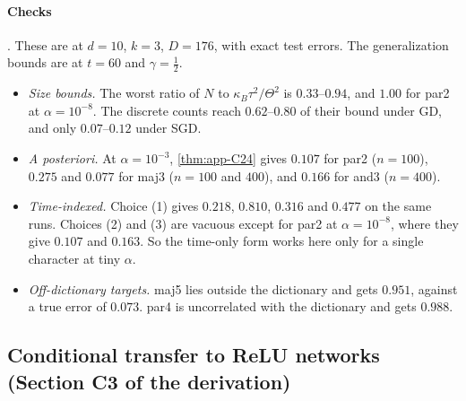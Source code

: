 \paragraph{Checks} . These are at $d=10$, $k=3$, $D=176$, with exact test errors. The generalization bounds are at $t=60$ and $\gamma=\frac12$.
\begin{itemize}[nosep]
\item \emph{Size bounds.} The worst ratio of $N$ to $\kappa_B\tau^2/\Theta^2$ is $0.33$--$0.94$, and $1.00$ for par2 at $\alpha=10^{-8}$. The discrete counts reach $0.62$--$0.80$ of their bound under GD, and only $0.07$--$0.12$ under SGD.
\item \emph{A posteriori.} At $\alpha=10^{-3}$, \cref{thm:app-C24} gives $0.107$ for par2 ($n=100$), $0.275$ and $0.077$ for maj3 ($n=100$ and $400$), and $0.166$ for and3 ($n=400$).
\item \emph{Time-indexed.} Choice (1) gives $0.218$, $0.810$, $0.316$ and $0.477$ on the same runs. Choices (2) and (3) are vacuous except for par2 at $\alpha=10^{-8}$, where they give $0.107$ and $0.163$. So the time-only form works here only for a single character at tiny $\alpha$.
\item \emph{Off-dictionary targets.} maj5 lies outside the dictionary and gets $0.951$, against a true error of $0.073$. par4 is uncorrelated with the dictionary and gets $0.988$.
\end{itemize}

\subsection{Conditional transfer to ReLU networks (Section C3 of the derivation)}\label{app:discrete:relu}

